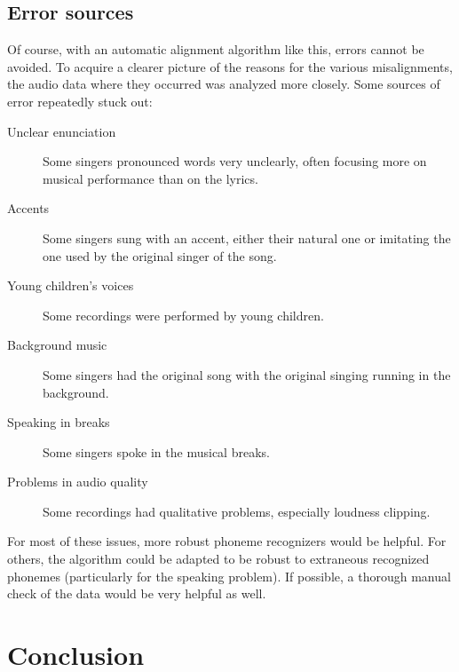 \subsection{Error sources}
Of course, with an automatic alignment algorithm like this, errors cannot be avoided. To acquire a clearer picture of the reasons for the various misalignments, the audio data where they occurred was analyzed more closely. Some sources of error repeatedly stuck out:
\begin{description}
 \item[Unclear enunciation]{Some singers pronounced words very unclearly, often focusing more on musical performance than on the lyrics.}
 \item[Accents]{Some singers sung with an accent, either their natural one or imitating the one used by the original singer of the song.}
 \item[Young children's voices]{Some recordings were performed by young children.}
 \item[Background music]{Some singers had the original song with the original singing running in the background.}
 \item[Speaking in breaks]{Some singers spoke in the musical breaks.}
 \item[Problems in audio quality]{Some recordings had qualitative problems, especially loudness clipping.}
\end{description}
For most of these issues, more robust phoneme recognizers would be helpful. For others, the algorithm could be adapted to be robust to extraneous recognized phonemes (particularly for the speaking problem). If possible, a thorough manual check of the data would be very helpful as well.



\section{Conclusion}
